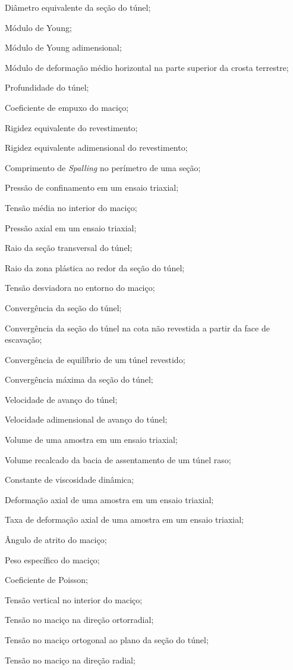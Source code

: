 \item[$D$]				Diâmetro equivalente da seção do túnel;
\item[$E$]				Módulo de Young;
\item[$E^*$]			Módulo de Young adimensional;
\item[$E_h$]			Módulo de deformação médio horizontal na parte superior da crosta terrestre;
\item[$H$]				Profundidade do túnel;
\item[$K$]				Coeficiente de empuxo do maciço;
\item[$K_r$]			Rigidez equivalente do revestimento;
\item[$K_r^*$]			Rigidez equivalente adimensional do revestimento;
\item[$L_s$]			Comprimento de \textit{Spalling} no perímetro de uma seção;
\item[$ P $] 			Pressão de confinamento em um ensaio triaxial;
\item[$ P_0 $] 			Tensão média no interior do maciço;
\item[$ Q $] 			Pressão axial em um ensaio triaxial;
\item[$ R $]			Raio da seção transversal do túnel;
\item[$ R^p $]			Raio da zona plástica ao redor da seção do túnel;
\item[$ S_0 $] 			Tensão desviadora no entorno do maciço;
\item[$ U $] 			Convergência da seção do túnel;
\item[$ U_{0} $] 		Convergência da seção do túnel na cota não revestida a partir da face de escavação;
\item[$ U_{eq} $] 		Convergência de equilíbrio de um túnel revestido;
\item[$ U_{max} $] 		Convergência máxima da seção do túnel;
\item[$ V $] 			Velocidade de avanço do túnel;
\item[$ V^* $] 			Velocidade adimensional de avanço do túnel;
\item[$ V_a $] 			Volume de uma amostra em um ensaio triaxial;
\item[$ V_{bacia} $]	Volume recalcado da bacia de assentamento de um túnel raso;

\item[$ \eta $] 		Constante de viscosidade dinâmica;
\item[$ \varepsilon_a $] Deformação axial de uma amostra em um ensaio triaxial;
\item[$ \dot{\varepsilon_a} $] Taxa de deformação axial de uma amostra em um ensaio triaxial;
\item[$ \phi $] 		Ângulo de atrito do maciço;
\item[$\gamma_m$] 		Peso específico do maciço;
\item[$ \nu $] 			Coeficiente de Poisson;
\item[$ \sigma_{v} $] 	Tensão vertical no interior do maciço;
\item[$ \sigma_{\theta \theta} $] Tensão no maciço na direção ortorradial;
\item[$ \sigma_{zz} $] 	Tensão no maciço ortogonal ao plano da seção do túnel;
\item[$ \sigma_{rr} $] 	Tensão no maciço na direção radial;